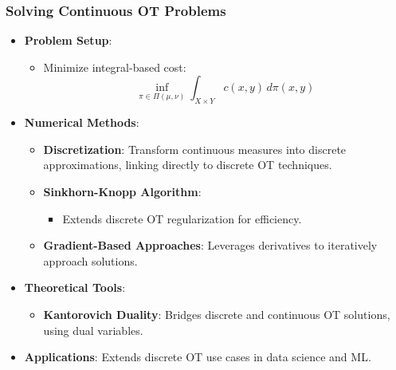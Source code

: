 \documentclass{beamer}
\begin{document}
	\begin{frame}
		\frametitle{Solving Continuous OT Problems}
		\begin{itemize}
			\item \textbf{Problem Setup}:
			\begin{itemize}
				\item Minimize integral-based cost:
				\[
				\inf_{\pi \in \Pi(\mu, \nu)} \int_{X \times Y} c(x, y) \, d\pi(x, y)
				\]
			\end{itemize}
			
			\item \textbf{Numerical Methods}:
			\begin{itemize}
				\item \textbf{Discretization}: Transform continuous measures into discrete approximations, linking directly to discrete OT techniques.
				\item \textbf{Sinkhorn-Knopp Algorithm}:
				\begin{itemize}
					\item Extends discrete OT regularization for efficiency.
				\end{itemize}
				\item \textbf{Gradient-Based Approaches}: Leverages derivatives to iteratively approach solutions.
			\end{itemize}
			
			\item \textbf{Theoretical Tools}:
			\begin{itemize}
				\item \textbf{Kantorovich Duality}: Bridges discrete and continuous OT solutions, using dual variables.
			\end{itemize}
			
			\item \textbf{Applications}: Extends discrete OT use cases in data science and ML.
		\end{itemize}
	\end{frame}
		
	
\end{document}
